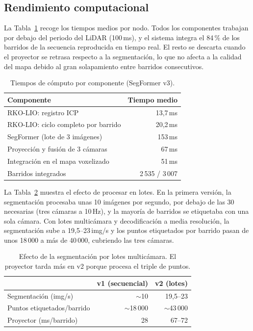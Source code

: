 \documentclass[11pt, twoside]{article}
\begin{document}
\subsection{Rendimiento computacional}

La Tabla~\ref{tab:tiempos} recoge los tiempos medios por nodo. Todos los componentes trabajan por debajo del periodo del LiDAR (100\,ms), y el sistema integra el 84\,\% de los barridos de la secuencia reproducida en tiempo real. El resto se descarta cuando el proyector se retrasa respecto a la segmentación, lo que no afecta a la calidad del mapa debido al gran solapamiento entre barridos consecutivos.

\begin{table}[t]
\centering
\small
\begin{tabular}{@{}lr@{}}
\toprule
\textbf{Componente} & \textbf{Tiempo medio} \\
\midrule
RKO-LIO: registro ICP & 13,7\,ms \\
RKO-LIO: ciclo completo por barrido & 20,2\,ms \\
SegFormer (lote de 3 imágenes) & 153\,ms \\
Proyección y fusión de 3 cámaras & 67\,ms \\
Integración en el mapa voxelizado & 51\,ms \\
\midrule
Barridos integrados & 2\,535 / 3\,007 \\
\bottomrule
\end{tabular}
\caption{Tiempos de cómputo por componente (SegFormer v3).}
\label{tab:tiempos}
\end{table}

La Tabla~\ref{tab:optim} muestra el efecto de procesar en lotes. En la primera versión, la segmentación procesaba unas 10 imágenes por segundo, por debajo de las 30 necesarias (tres cámaras a 10\,Hz), y la mayoría de barridos se etiquetaba con una sola cámara. Con lotes multicámara y decodificación a media resolución, la segmentación sube a 19,5--23\,img/s y los puntos etiquetados por barrido pasan de unos 18\,000 a más de 40\,000, cubriendo las tres cámaras.

\begin{table}[t]
\centering
\small
\setlength{\tabcolsep}{4pt}
\begin{tabular}{@{}lrr@{}}
\toprule
 & \textbf{v1 (secuencial)} & \textbf{v2 (lotes)} \\
\midrule
Segmentación (img/s)      & $\sim$10 & 19,5--23 \\
Puntos etiquetados/barrido & $\sim$18\,000 & $\sim$43\,000 \\
Proyector (ms/barrido)    & 28 & 67--72 \\
\bottomrule
\end{tabular}
\caption{Efecto de la segmentación por lotes multicámara. El proyector tarda más en v2 porque procesa el triple de puntos.}
\label{tab:optim}
\end{table}
\end{document}
